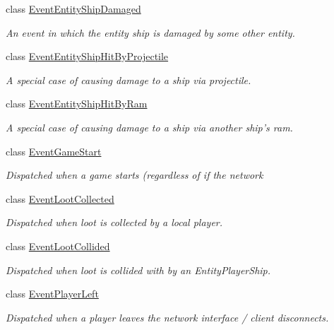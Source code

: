 \begin{DoxyCompactItemize}
class \hyperlink{class_skyrates_1_1_client_1_1_game_1_1_event_1_1_event_entity_ship_damaged}{Event\-Entity\-Ship\-Damaged}
\begin{DoxyCompactList}\small\item\em An event in which the entity ship is damaged by some other entity. \end{DoxyCompactList}\item 
class \hyperlink{class_skyrates_1_1_client_1_1_game_1_1_event_1_1_event_entity_ship_hit_by_projectile}{Event\-Entity\-Ship\-Hit\-By\-Projectile}
\begin{DoxyCompactList}\small\item\em A special case of causing damage to a ship via projectile. \end{DoxyCompactList}\item 
class \hyperlink{class_skyrates_1_1_client_1_1_game_1_1_event_1_1_event_entity_ship_hit_by_ram}{Event\-Entity\-Ship\-Hit\-By\-Ram}
\begin{DoxyCompactList}\small\item\em A special case of causing damage to a ship via another ship's ram. \end{DoxyCompactList}\item 
class \hyperlink{class_skyrates_1_1_client_1_1_game_1_1_event_1_1_event_game_start}{Event\-Game\-Start}
\begin{DoxyCompactList}\small\item\em Dispatched when a game starts (regardless of if the network \end{DoxyCompactList}\item 
class \hyperlink{class_skyrates_1_1_client_1_1_game_1_1_event_1_1_event_loot_collected}{Event\-Loot\-Collected}
\begin{DoxyCompactList}\small\item\em Dispatched when loot is collected by a local player. \end{DoxyCompactList}\item 
class \hyperlink{class_skyrates_1_1_client_1_1_game_1_1_event_1_1_event_loot_collided}{Event\-Loot\-Collided}
\begin{DoxyCompactList}\small\item\em Dispatched when loot is collided with by an Entity\-Player\-Ship. \end{DoxyCompactList}\item 
class \hyperlink{class_skyrates_1_1_client_1_1_game_1_1_event_1_1_event_player_left}{Event\-Player\-Left}
\begin{DoxyCompactList}\small\item\em Dispatched when a player leaves the network interface / client disconnects. \end{DoxyCompactList}\item 

\end{DoxyCompactItemize}
